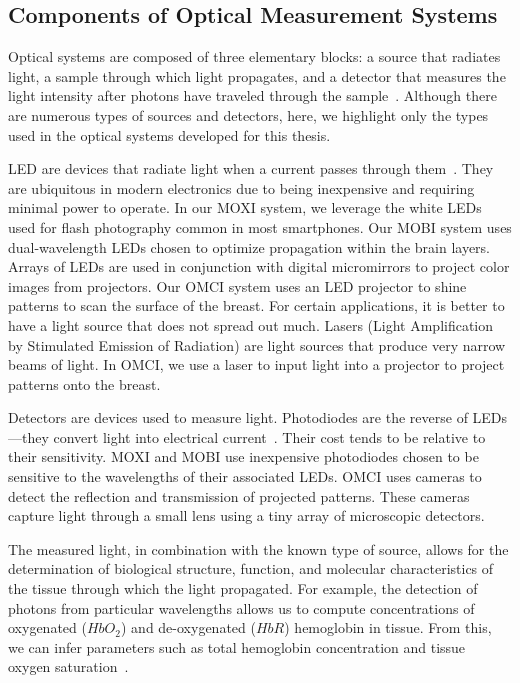 \subsection{Components of Optical Measurement Systems}
Optical systems are composed of three elementary blocks: a source that radiates light, a sample through which light propagates, and a detector that measures the light intensity after photons have traveled through the sample~\cite{Webster2010}. Although there are numerous types of sources and detectors, here, we highlight only the types used in the optical systems developed for this thesis. 

\ac{LED} are devices that radiate light when a current passes through them~\cite{Webster2010}. They are ubiquitous in modern electronics due to being inexpensive and requiring minimal power to operate. In our \ac{MOXI} system, we leverage the white LEDs used for flash photography common in most smartphones. Our \ac{MOBI} system uses dual-wavelength \ac{LED}s chosen to optimize propagation within the brain layers. Arrays of \ac{LED}s are used in conjunction with digital micromirrors to project color images from projectors. Our \ac{OMCI} system uses an \ac{LED} projector to shine patterns to scan the surface of the breast. For certain applications, it is better to have a light source that does not spread out much. Lasers (Light Amplification by Stimulated Emission of Radiation) are light sources that produce very narrow beams of light. In \ac{OMCI}, we use a laser to input light into a projector to project patterns onto the breast. 

Detectors are devices used to measure light. Photodiodes are the reverse of \ac{LED}s---they convert light into electrical current~\cite{Webster2010}. Their cost tends to be relative to their sensitivity. \ac{MOXI} and \ac{MOBI} use inexpensive photodiodes chosen to be sensitive to the wavelengths of their associated \ac{LED}s. \ac{OMCI} uses cameras to detect the reflection and transmission of projected patterns. These cameras capture light through a small lens using a tiny array of microscopic detectors. 

The measured light, in combination with the known type of source, allows for the determination of biological structure, function, and molecular characteristics of the tissue through which the light propagated. For example, the detection of photons from particular wavelengths allows us to compute concentrations of oxygenated ($HbO_2$) and de-oxygenated ($HbR$) hemoglobin in tissue. From this, we can infer parameters such as total hemoglobin concentration and tissue oxygen saturation~\cite{Nunez2018}. 

